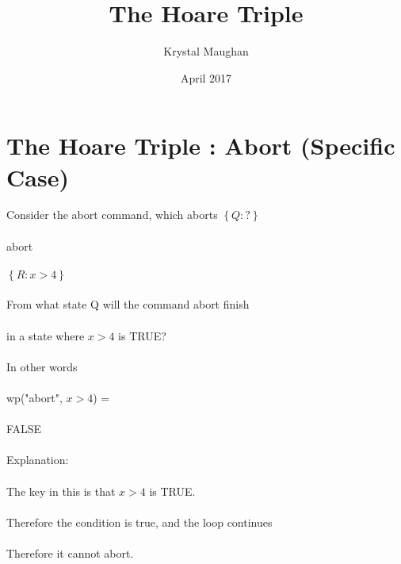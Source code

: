 \documentclass{article}
\title{The Hoare Triple}
\author{Krystal Maughan }
\date{April 2017}
\begin{document}
\maketitle

\section{The Hoare Triple : Abort (Specific Case)}
Consider the abort command, which aborts
$\left\{Q : ? \right\}$ 
\\
\\
abort
\\
\\
$\left\{R : x > 4 \right\}$ 
\\
\\
From what state Q will the command abort finish
\\
\\
in a state where $x > 4$ is TRUE?
\\
\\
In other words
\\
\\
wp("abort", $x > 4$) = 
\\
\\
FALSE
\\
\\
Explanation:
\\
\\
The key in this is that $x > 4$ is TRUE.
\\
\\
Therefore the condition is true, and the loop continues
\\
\\
Therefore it cannot abort. 
\\
\\
\\
\\
\\
\\
\\
\\
\\
\\
\\
\end{document}
